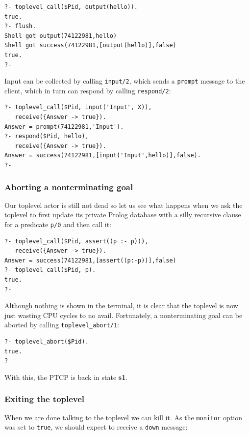 \begin{verbatim}
?- toplevel_call($Pid, output(hello)).
true.
?- flush.
Shell got output(74122981,hello)
Shell got success(74122981,[output(hello)],false)
true.
?-
\end{verbatim}

\noindent Input can be collected by calling \texttt{input/2}, which sends a \texttt{prompt} message to the client, which in turn can respond by calling \texttt{respond/2}:

\begin{verbatim}
?- toplevel_call($Pid, input('Input', X)),
   receive({Answer -> true}).
Answer = prompt(74122981,'Input').
?- respond($Pid, hello), 
   receive({Answer -> true}).
Answer = success(74122981,[input('Input',hello)],false).
?- 
\end{verbatim}

\subsubsection{Aborting a nonterminating goal}\label{sec:toplevel-abort}

\noindent Our toplevel actor is still not dead so let us see what happens when we ask the toplevel to first update its private Prolog database with a silly recursive clause for a predicate \texttt{p/0} and then call it:

\begin{verbatim}
?- toplevel_call($Pid, assert((p :- p))),
   receive({Answer -> true}).
Answer = success(74122981,[assert((p:-p))],false)
?- toplevel_call($Pid, p).
true.
?-
\end{verbatim}

\noindent Although nothing is shown in the terminal, it is clear that the toplevel is now just wasting CPU cycles to no avail. Fortunately, a nonterminating goal can be aborted by calling \texttt{toplevel\_abort/1}:

\begin{verbatim}
?- toplevel_abort($Pid).
true.
?-
\end{verbatim}

\noindent With this, the PTCP is back in state \textbf{s1}.

\subsubsection{Exiting the toplevel}\label{sec:toplevel-exit}

\noindent When we are done talking to the toplevel we can kill it. As the \texttt{monitor} option was set to \texttt{true}, we should expect to receive a \texttt{down} message:

